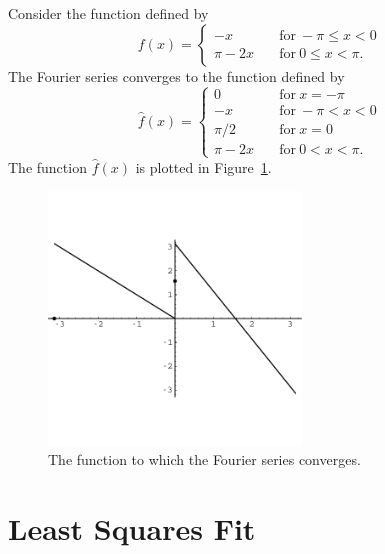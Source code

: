 \begin{Example}
  Consider the function defined by
  \[ f(x) = 
  \begin{cases}
    -x \quad &\mathrm{for}\ -\pi \leq x < 0 \\
    \pi - 2x \quad &\mathrm{for}\ 0 \leq x < \pi.
  \end{cases}
  \]
  The Fourier series converges to the function defined by
  \[ \hat{f}(x) = 
  \begin{cases}
    0 \quad &\mathrm{for}\ x = -\pi \\
    -x \quad &\mathrm{for}\ -\pi < x < 0 \\
    \pi / 2 \quad &\mathrm{for}\ x = 0 \\
    \pi - 2x \quad &\mathrm{for}\ 0 < x < \pi. 
  \end{cases}
  \]
  The function $\hat{f}(x)$ is plotted in Figure~\ref{disc_fcn}.

  \begin{figure}[h!]
    \begin{center}
      \includegraphics[width=0.6\textwidth]{ode/fourier_series/disc_fcn}
    \end{center}
    \caption{The function to which the Fourier series converges.}
    \label{disc_fcn}
  \end{figure}

\end{Example}











\section{Least Squares Fit}



